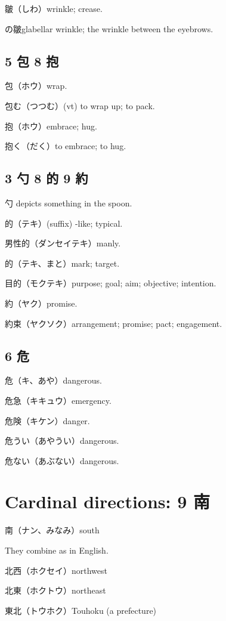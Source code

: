 皺（しわ）wrinkle; crease.

の皺glabellar wrinkle; the wrinkle between the eyebrows.

\subsection{5 包 8 抱}

包（ホウ）wrap.

包む（つつむ）(vt) to wrap up; to pack.

抱（ホウ）embrace; hug.

抱く（だく）to embrace; to hug.

\subsection{3 勺 8 的 9 約}

勺 depicts something in the spoon.

的（テキ）(suffix) -like; typical.

男性的（ダンセイテキ）manly.

的（テキ、まと）mark; target.

目的（モクテキ）purpose; goal; aim; objective; intention.

約（ヤク）promise.

約束（ヤクソク）arrangement; promise; pact; engagement.

\subsection{6 危}

危（キ、あや）dangerous.

危急（キキュウ）emergency.

危険（キケン）danger.

危うい（あやうい）dangerous.

危ない（あぶない）dangerous.

\section{Cardinal directions: 9 南}

南（ナン、みなみ）south

They combine as in English.

北西（ホクセイ）northwest

北東（ホクトウ）northeast

東北（トウホク）Touhoku (a prefecture)

